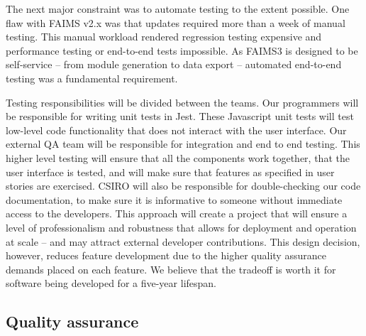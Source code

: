 \documentclass{faims3_report}
\begin{document}
The next major constraint was to automate testing to the extent
possible. One flaw with FAIMS v2.x was that updates required more than a
week of manual testing. This manual workload rendered regression testing
expensive and performance testing or end-to-end tests impossible. As
FAIMS3 is designed to be self-service -- from module generation to
data export -- automated end-to-end testing was a fundamental
requirement.

Testing responsibilities will be divided between the teams. Our
programmers will be responsible for writing unit tests in Jest. These
Javascript unit tests will test low-level code functionality that does
not interact with the user interface. Our external QA team will be
responsible for integration and end to end testing. This higher level
testing will ensure that all the components work together, that the user
interface is tested, and will make sure that features as specified in
user stories are exercised. CSIRO will also be responsible for
double-checking our code documentation, to make sure it is informative
to someone without immediate access to the developers. This approach
will create a project that will ensure a level of professionalism and
robustness that allows for deployment and operation at scale -- and
may attract external developer contributions. This design decision,
however, reduces feature development due to the higher quality assurance
demands placed on each feature. We believe that the tradeoff is worth it
for software being developed for a five-year lifespan.

\subsection{Quality assurance}
\end{document}
